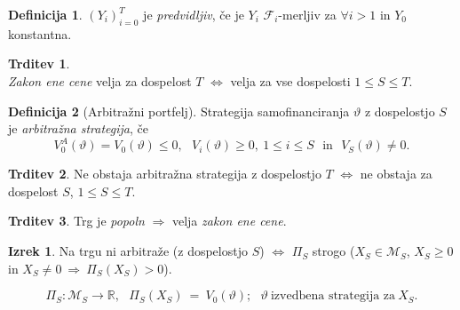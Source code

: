 \documentclass[11pt]{article}
\newcommand{\R}{\mathbb{R}}
\newcommand{\M}{\mathcal{M}}
\newcommand{\F}{\mathcal{F}}
\theoremstyle{definition}
\newtheorem{definicija}{Definicija}[section]
\theoremstyle{definition}
\newtheorem{trditev}{Trditev}[section]
\newtheorem{izrek}{Izrek}[section]
\begin{document}
\begin{definicija}

$(Y_i)_{i=0}^T$ je \textit{predvidljiv}, če je $Y_i$ $\F_i$-merljiv za $\forall i > 1$ in $Y_0$ konstantna.

\end{definicija}
\vspace{0.5cm}

\begin{trditev}
~\\
\textit{Zakon ene cene} velja za dospelost $T$ $\iff$ velja za vse dospelosti $1 \leq S \leq T$.

\end{trditev}
\vspace{0.5cm}

\begin{definicija}[Arbitražni portfelj]

Strategija samofinanciranja $\vartheta$ z dospelostjo $S$ je \textit{arbitražna strategija}, če 
$$V_0^A(\vartheta) = V_0(\vartheta) \leq 0, ~~~V_i(\vartheta) \geq 0, ~1 \leq i \leq S ~~~\text{in}~~~ V_S(\vartheta) \neq 0.$$

\end{definicija}
\vspace{0.5cm}

\begin{trditev}

Ne obstaja arbitražna strategija z dospelostjo $T$ $\iff$ ne obstaja za dospelost $S$, $1 \leq S \leq T$.

\end{trditev}
\vspace{0.5cm}

\begin{trditev}

Trg je \textit{popoln} $\Longrightarrow$ velja \textit{zakon ene cene}.

\end{trditev}
\vspace{0.5cm}

\begin{izrek}

Na trgu ni arbitraže (z dospelostjo $S$) $\iff$ $\Pi_S$ strogo (\hbox{$X_S \in \M_S$}, $X_S \geq 0$ in $X_S \neq 0 ~\Rightarrow~ \Pi_S(X_S) > 0$). 

$$\Pi_S: \M_S \rightarrow \R, ~~~\Pi_S(X_S) ~=~ V_0(\vartheta); ~~~\vartheta ~\text{izvedbena strategija za}~ X_S.$$

\end{izrek}
\vspace{0.5cm}
\end{document}
